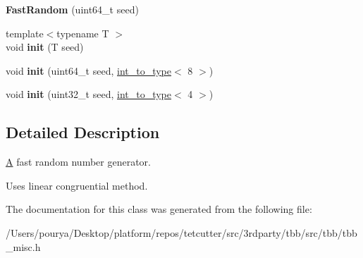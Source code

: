 \begin{DoxyCompactItemize}
\item 
\hypertarget{classtbb_1_1internal_1_1FastRandom_a8432126f4b2f9d9c32215f61a0b0ed68}{}{\bfseries Fast\+Random} (uint64\+\_\+t seed)\label{classtbb_1_1internal_1_1FastRandom_a8432126f4b2f9d9c32215f61a0b0ed68}

\item 
\hypertarget{classtbb_1_1internal_1_1FastRandom_a37a4b389d6f21ffc2ff62d9946e281ae}{}{\footnotesize template$<$typename T $>$ }\\void {\bfseries init} (T seed)\label{classtbb_1_1internal_1_1FastRandom_a37a4b389d6f21ffc2ff62d9946e281ae}

\item 
\hypertarget{classtbb_1_1internal_1_1FastRandom_ad8e428afabb95e9077ce29d0f875ec04}{}void {\bfseries init} (uint64\+\_\+t seed, \hyperlink{structtbb_1_1internal_1_1int__to__type}{int\+\_\+to\+\_\+type}$<$ 8 $>$)\label{classtbb_1_1internal_1_1FastRandom_ad8e428afabb95e9077ce29d0f875ec04}

\item 
\hypertarget{classtbb_1_1internal_1_1FastRandom_ab351be5ec40bb0d9dfc759f0333de682}{}void {\bfseries init} (uint32\+\_\+t seed, \hyperlink{structtbb_1_1internal_1_1int__to__type}{int\+\_\+to\+\_\+type}$<$ 4 $>$)\label{classtbb_1_1internal_1_1FastRandom_ab351be5ec40bb0d9dfc759f0333de682}

\end{DoxyCompactItemize}


\subsection{Detailed Description}
\hyperlink{structA}{A} fast random number generator. 

Uses linear congruential method. 

The documentation for this class was generated from the following file\+:\begin{DoxyCompactItemize}
\item 
/\+Users/pourya/\+Desktop/platform/repos/tetcutter/src/3rdparty/tbb/src/tbb/tbb\+\_\+misc.\+h\end{DoxyCompactItemize}
